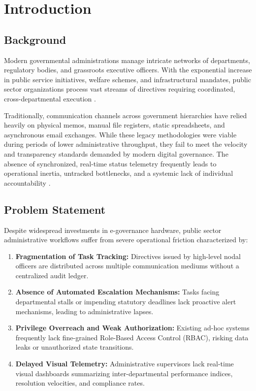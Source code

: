\chapter{Introduction}
\label{ch:introduction}

\section{Background}
\label{sec:background}
Modern governmental administrations manage intricate networks of departments, regulatory bodies, and grassroots executive officers. With the exponential increase in public service initiatives, welfare schemes, and infrastructural mandates, public sector organizations process vast streams of directives requiring coordinated, cross-departmental execution \cite{heeks2006implementing}. 

Traditionally, communication channels across government hierarchies have relied heavily on physical memos, manual file registers, static spreadsheets, and asynchronous email exchanges. While these legacy methodologies were viable during periods of lower administrative throughput, they fail to meet the velocity and transparency standards demanded by modern digital governance. The absence of synchronized, real-time status telemetry frequently leads to operational inertia, untracked bottlenecks, and a systemic lack of individual accountability \cite{almarabeh2010investigating}.

\section{Problem Statement}
\label{sec:problem_statement}
Despite widespread investments in e-governance hardware, public sector administrative workflows suffer from severe operational friction characterized by:
\begin{enumerate}
    \item \textbf{Fragmentation of Task Tracking:} Directives issued by high-level nodal officers are distributed across multiple communication mediums without a centralized audit ledger.
    \item \textbf{Absence of Automated Escalation Mechanisms:} Tasks facing departmental stalls or impending statutory deadlines lack proactive alert mechanisms, leading to administrative lapses.
    \item \textbf{Privilege Overreach and Weak Authorization:} Existing ad-hoc systems frequently lack fine-grained Role-Based Access Control (RBAC), risking data leaks or unauthorized state transitions.
    \item \textbf{Delayed Visual Telemetry:} Administrative supervisors lack real-time visual dashboards summarizing inter-departmental performance indices, resolution velocities, and compliance rates.
\end{enumerate}


